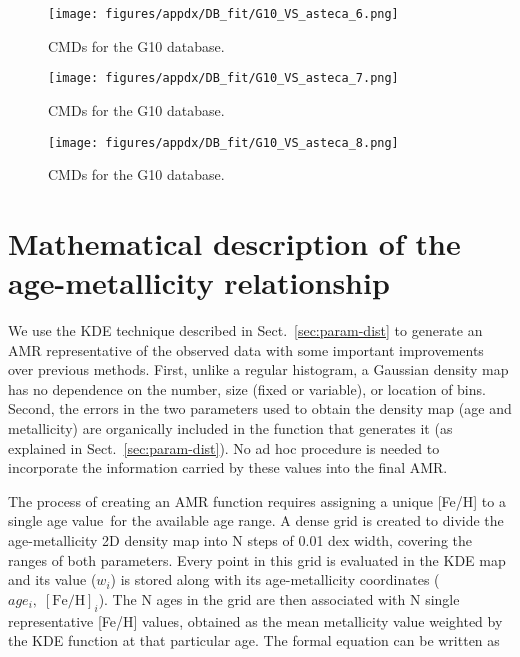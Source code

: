 \documentclass[draft]{aa}
\renewcommand{\includegraphics}[2][]{}
\begin{document}
\begin{appendix}
\begin{figure*}
\texttt{[image: figures/appdx/DB\_fit/G10\_VS\_asteca\_6.png]}
\caption{CMDs for the G10 database.}
\label{fig:DBs_G10_6}
\end{figure*}
\clearpage

\begin{figure*}
\texttt{[image: figures/appdx/DB\_fit/G10\_VS\_asteca\_7.png]}
\caption{CMDs for the G10 database.}
\label{fig:DBs_G10_7}
\end{figure*}
\clearpage

\begin{figure}
\centering
\texttt{[image: figures/appdx/DB\_fit/G10\_VS\_asteca\_8.png]}
\caption{CMDs for the G10 database.}
\label{fig:DBs_G10_8}
\end{figure}





\section{Mathematical description of the age-metallicity relationship}
\label{apdx:amr_description}

We use the KDE technique described in Sect.~\ref{sec:param-dist} to
generate an AMR representative of the observed data with some important
improvements over previous methods.
%
First, unlike a regular histogram, a Gaussian density map has no dependence on
the number, size (fixed or variable), or location of bins.
Second, the errors in the two parameters used to obtain the density map (age and
metallicity) are organically included in the function that generates it
(as explained in Sect.~\ref{sec:param-dist}). No ad hoc procedure is needed to
incorporate the information carried by these values into the final AMR.\@

The process of creating an AMR function
requires assigning a unique [Fe/H] to a single age value\ for the available age
range.
%
A dense grid is created to divide the age-metallicity 2D density map into N
steps of 0.01 dex width, covering the ranges of both parameters. Every point in
this grid is evaluated in the KDE map and its value ($w_{i}$) is stored along
with its age-metallicity coordinates ($age_{i},\;[\mathrm{Fe/H}]_{i}$).
%
The N ages in the grid are then associated with N single representative [Fe/H]
values, obtained as the mean metallicity value weighted by the KDE function at
that particular age. The formal equation can be written as


\end{appendix}
\end{document}
